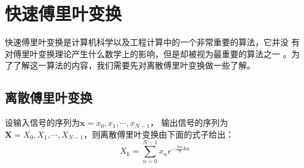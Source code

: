 \chapter{快速傅里叶变换}
    快速傅里叶变换是计算机科学以及工程计算中的一个非常重要的算法，它并没%
    有对傅里叶变换理论产生什么数学上的影响，但是却被视为最重要的算法之一%
    。为了了解这一算法的内容，我们需要先对离散傅里叶变换做一些了解。
    \section{离散傅里叶变换}
        设输入信号的序列为$\textbf{x} = {x_0, x_1, \cdots, x_{N - 1}}$， 输出信号的序列为$\textbf{X} = {X_0, X_1, \cdots, X_{N - 1}}$，则离散傅里叶变换由下面的式子给出：
        \begin{equation}
            X_k = \sum_{n = 0}^{N - 1} x_n e^{-\frac{2\pi i}{N}kn}
            \label{eq: 4.1}
        \end{equation}
        